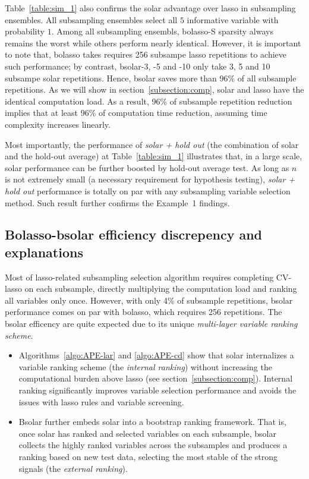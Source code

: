 \documentclass[12pt]{article}
\begin{document}
Table~\ref{table:sim_1} also confirms the solar advantage over lasso in subsampling ensembles. All subsampling ensembles select all $5$ informative variable with probability $1$. Among all subsampling ensembls, bolasso-S sparsity always remains the worst while others perform nearly identical. However, it is important to note that, bolasso takes requires 256 subsampe lasso repetitions to achieve such performance; by contrast, bsolar-3, -5 and -10 only take 3, 5 and 10 subsampe solar repetitions. Hence, bsolar saves more than 96\% of all subsample repetitions. As we will show in section~\ref{subsection:comp}, solar and lasso have the identical computation load. As a result, 96\% of subsample repetition reduction implies that at least 96\% of computation time reduction, assuming time complexity increases linearly.

Most importantly, the performance of \emph{solar + hold out} (the combination of solar and the hold-out average) at Table~\ref{table:sim_1} illustrates that, in a large scale, solar performance can be further boosted by hold-out average test. As long as $n$ is not extremely small (a necessary requirement for hypothesis testing), \emph{solar + hold out} performance is totally on par with any subsampling variable selection method. Such result further confirms the Example~1 findings.

\subsection{Bolasso-bsolar efficiency discrepency and explanations}

Most of lasso-related subsampling selection algorithm requires completing CV-lasso on each subsample, directly multiplying the computation load and ranking all variables only once. However, with only 4\% of subsample repetitions, bsolar performance comes on par with bolasso, which requires 256 repetitions. The bsolar efficency are quite expected due to its unique \emph{multi-layer variable ranking scheme}.

\begin{itemize}
  \item Algorithms~\ref{algo:APE-lar} and \ref{algo:APE-cd} show that solar internalizes a variable ranking scheme (the \emph{internal ranking}) without increasing the computational burden above lasso (see section~\ref{subsection:comp}). Internal ranking significantly improves variable selection performance and avoids the issues with lasso rules and variable screening.

  \item Bsolar further embeds solar into a bootstrap ranking framework. That is, once solar has ranked and selected variables on each subsample, bsolar collects the highly ranked variables across the subsamples and produces a ranking based on new test data, selecting the most stable of the strong signals (the \emph{external ranking}).
\end{itemize}
\end{document}
